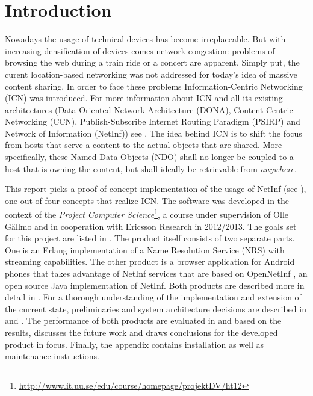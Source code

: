\chapter{Introduction}

Nowadays the usage of technical devices has become irreplaceable. But with increasing
densification of devices comes network congestion: problems of
browsing the web during a train ride or a concert are apparent. Simply put, the curent
location-based networking was not addressed for today's idea of massive content sharing. 
In order to face these problems Information-Centric Networking (ICN) was introduced. For
more information about ICN and all its existing architectures (Data-Oriented Network Architecture (DONA),
Content-Centric Networking (CCN), Publish-Subscribe Internet Routing Paradigm (PSIRP) and Network of Information (NetInf)) 
see \cite{netinf}.
The idea behind ICN is to shift the focus from hosts that serve a content to the actual objects that
are shared. More specifically, these Named Data Objects (NDO) shall no longer be coupled
to a host that is owning the content, but shall ideally be retrievable from \textit{anywhere}.

This report picks a proof-of-concept implementation of the usage of NetInf
(see ), one out of four concepts that realize ICN. The software was
developed in the context of the 
\textit{Project Computer Science}\footnote{\url{http://www.it.uu.se/edu/course/homepage/projektDV/ht12}},
a course under supervision of Olle G\"{a}llmo and in cooperation with Ericsson Research \cite{ericsson}
in 2012/2013. The goals set for this project are listed in . 
The product itself consists of two separate parts. One is an Erlang \cite{erlang} implementation of a Name Resolution Service (NRS) with streaming capabilities.
The other product is a browser application for Android \cite{android}  phones that takes advantage of NetInf services that
are based on OpenNetInf \cite{opennetinf}, an open source Java implementation of NetInf. 
Both products are described more in detail in . For a thorough understanding
of the implementation and extension of the current state, preliminaries and system architecture decisions are 
described in  and . 
The performance of both products are evaluated in  and based on the results,
 discusses the future work and draws conclusions for the developed product
in focus. Finally, the appendix contains installation as well as maintenance instructions.